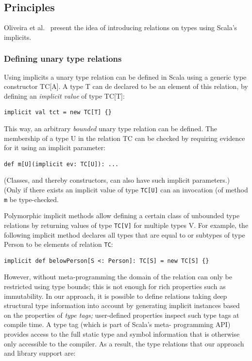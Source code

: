 \documentclass[preprint]{sigplanconf}
\begin{document}
\subsection{Principles}

Oliveira et al.~\cite{Oliveira2010} present the idea of introducing relations
on types using Scala’s implicits.

\subsubsection{Defining unary type relations}

Using implicits a unary type relation can be defined in Scala using a generic
type constructor TC[A]. A type T can de declared to be an element of this
relation, by defining an {\em implicit value} of type TC[T]:

\begin{lstlisting}
implicit val tct = new TC[T] {}
\end{lstlisting}
\noindent

This way, an arbitrary {\em bounded} unary type relation can be defined. The
membership of a type U in the relation TC can be checked by requiring evidence
for it using an implicit parameter:

\begin{lstlisting}
def m[U](implicit ev: TC[U]): ...
\end{lstlisting}
\noindent

(Classes, and thereby constructors, can also have such implicit parameters.)
(Only if there exists an implicit value of type \verb|TC[U]| can an invocation
(of method \verb|m| be type-checked.

Polymorphic implicit methods allow defining a certain class of unbounded type
relations by returning values of type \verb|TC[V]| for multiple types V. For
example, the following implicit method declares all types that are equal to or
subtypes of type Person to be elements of relation \verb|TC|:

\begin{lstlisting}
implicit def belowPerson[S <: Person]: TC[S] = new TC[S] {}
\end{lstlisting}
\noindent

However, without meta-programming the domain of the relation can only be
restricted using type bounds; this is not enough for rich properties such as
immutability. In our approach, it is possible to define relations taking deep
structural type information into account by generating implicit instances
based on the properties of {\em type tags;} user-defined properties inspect
such type tags at compile time. A type tag (which is part of Scala’s meta-
programming API) provides access to the full static type and symbol
information that is otherwise only accessible to the compiler. As a result,
the type relations that our approach and library support are:
\end{document}
